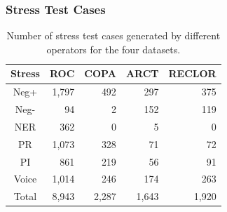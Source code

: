 \subsubsection{Stress Test Cases}
%
\begin{table}[th]
\centering
\scriptsize
\begin{tabular}{c|rrrr}
\toprule
\textbf{Stress} & \textbf{ROC} & \textbf{COPA} & \textbf{ARCT} & \textbf{RECLOR} \\ \midrule
Neg+  & 1,797&492&  297&375 \\ \hline
Neg-  & 94& 2&  152&    119\\ \hline
NER  &  362&    0&  5&0 \\ \hline
PR  &   1,073&  328&71&72   \\ \hline
PI  &        861&   219&    56& 91\\  \hline
Voice  &    1,014&246   &174    &263    \\  \midrule
Total &8,943    &2,287  &1,643  &1,920 \\ \bottomrule
\end{tabular}
\caption{Number of stress test cases generated
by different operators for the four datasets.}
\label{tab:cases}
\end{table}

